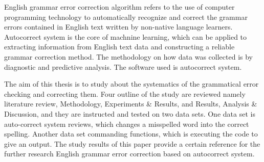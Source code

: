 \documentclass{standalone}
\begin{document}
\begin{englishabstract}
English grammar error correction algorithm refers to the use of computer programming technology to automatically recognize and correct the grammar errors contained in English text written by non-native language learners. Autocorrect system is the core of machnine learning, which can be applied to extracting information from English text data and constructing a reliable grammar correction method. The methodology on how data was collected is by diagnostic and predictive analysis. The software used is autocorrect system.

 The aim of this thesis is to study about the systematics of the grammatical error checking and correcting them. Four outline of the study are reviewed namely literature review, Methodology, Experiments & Results, and Results, Analysis & Discussion, and they are instructed and tested on two data sets. One data set is auto-correct system reviews, which changes a misspelled word into the correct spelling. Another data set commanding functions, which is executing the code to give an output. The study results of this paper provide a certain reference for the further research English grammar error correction based on autocorrect system.

    
\end{englishabstract}
\end{document}
